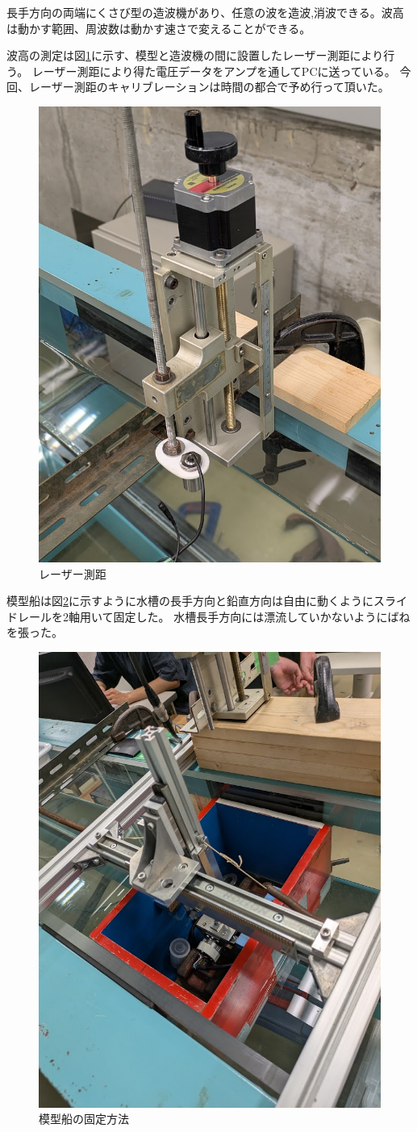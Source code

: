 \documentclass[dvipdfmx,a4paper]{jreport} %
\begin{document}
長手方向の両端にくさび型の造波機があり、任意の波を造波,消波できる。波高は動かす範囲、周波数は動かす速さで変えることができる。


波高の測定は図\ref{fig:laser}に示す、模型と造波機の間に設置したレーザー測距により行う。
レーザー測距により得た電圧データをアンプを通してPCに送っている。
今回、レーザー測距のキャリブレーションは時間の都合で予め行って頂いた。

\begin{figure}[H]
    \centering
    \includegraphics[width=0.5\linewidth]{summer/ship-experiment/2d-pool/pictures/laser.png}
    \caption{レーザー測距}
    \label{fig:laser}
\end{figure}

模型船は図\ref{fig:kotei}に示すように水槽の長手方向と鉛直方向は自由に動くようにスライドレールを2軸用いて固定した。
水槽長手方向には漂流していかないようにばねを張った。
\begin{figure}[H]
    \centering
    \includegraphics[width=0.5\linewidth]{summer/ship-experiment/2d-pool/pictures/kotei.png}
    \caption{模型船の固定方法}
    \label{fig:kotei}
\end{figure}
\end{document}
